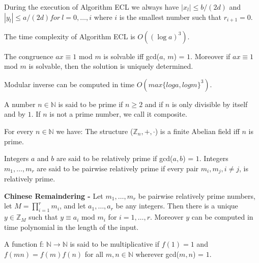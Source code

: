 \documentclass[a4paper]{article}
\begin{document}
\begin{theorem}
During the execution of Algorithm ECL we always have $|x_{\mathit{l}}| \leq b / (2d)$ and $|y_{\mathit{l}}| \leq a/(2d) for\ \mathit{l} = 0, \ldots, i$ where $i$ is the smallest number such that $r_{i+1} = 0$.
\end{theorem}


\begin{theorem}
The time complexity of Algorithm ECL is $O((\log{a})^{3})$.
\end{theorem}


\begin{theorem}
The congruence $ax \equiv 1$ mod $m$ is solvable iff gcd($a$, $m$) = $1$. Moreover if $ax \equiv 1$ mod $m$ is solvable, then the solution is uniquely determined.
\end{theorem}


\begin{theorem}
Modular inverse can be computed in time $O(max\{log{a}, log{m}\}^{3})$.
\end{theorem}


\begin{definition}
A number $n \in \mathbb{N}$ is said to be prime if $n \geq 2$ and if $n$ is only divisible by itself and by $1$. If $n$ is not a prime number, we call it composite.
\end{definition}


\begin{corollary}
For every $n \in \mathbb{N}$ we have: The structure ($\mathbb{Z}_{n}, +, \cdot$) is a finite Abelian field iff $n$ is prime.
\end{corollary}


\begin{definition}
Integers $a$ and $b$ are said to be relatively prime if gcd($a, b$) = $1$. Integers $m_{1}, \ldots, m_{r}$ are said to be pairwise relatively prime if every pair $m_{i}, m_{j}, i \neq j$, is relatively prime.
\end{definition}


\begin{theorem}
\textbf{Chinese Remaindering -}
Let $m_{1}, \ldots, m_{r}$ be pairwise relatively prime numbers, let $M = \prod^{r}_{i=1}m_{i}$, and let $a_{1}, \ldots, a_{r}$ be any integers. Then there is a unique $y \in \mathbb{Z}_{M}$ such that $ y \equiv a_{i}$ mod $m_{i}$ for $i = 1, \ldots, r$. Moreover $y$ can be computed in time polynomial in the length of the input.
\end{theorem}


\begin{definition}
A function f: $\mathbb{N} \rightarrow \mathbb{N}$ is said to be multiplicative if $f(1) = 1$ and $f(mn) = f(m)f(n)$ for all $m, n \in \mathbb{N}$ wherever gcd($m, n$) = $1$.
\end{definition}
\end{document}
